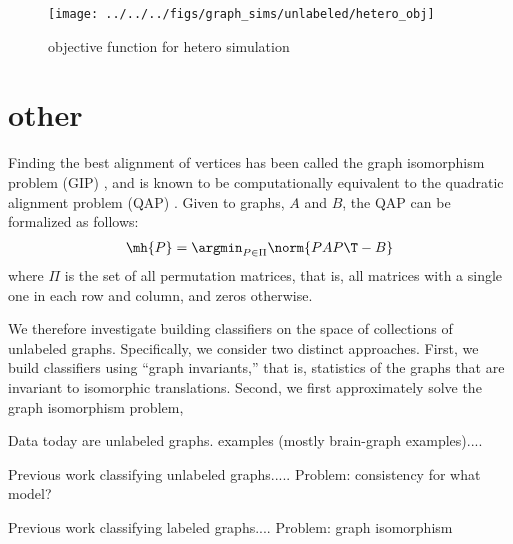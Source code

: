 \begin{figure}[!ht]
\centering \texttt{[image: ../../../figs/graph\_sims/unlabeled/hetero\_obj]}
\caption{objective function for hetero simulation}
\label{fig:sim1_params}
\end{figure}










\clearpage
\section{other} %
\label{sec:other}





Finding the best alignment of vertices has been called the graph isomorphism problem (GIP) \cite{??}, and is known to be computationally equivalent to the quadratic alignment problem (QAP) \cite{??}.  Given to graphs, $A$ and $B$, the QAP can be formalized as follows:
\begin{align}
	\mh{P} = \argmin_{P \in \Pi} \norm{PAP\T - B}
\end{align}
where $\Pi$ is the set of all permutation matrices, that is, all matrices with a single one in each row and column, and zeros otherwise.  


We therefore investigate building classifiers on the space of collections of unlabeled graphs.  Specifically, we consider two distinct approaches. First, we build classifiers using ``graph invariants,'' that is, statistics of the graphs that are invariant to isomorphic translations.  Second, we first approximately solve the graph isomorphism problem,  





Data today are unlabeled graphs.  examples (mostly brain-graph examples)....

Previous work classifying unlabeled graphs..... Problem: consistency for what model?

Previous work classifying labeled graphs.... Problem: graph isomorphism

